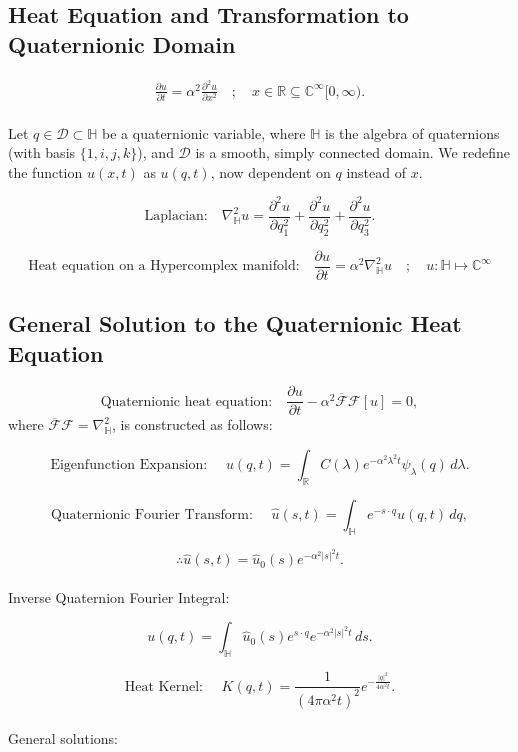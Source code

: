 \documentclass{article}
\begin{document}
\subsection{Heat Equation and Transformation to Quaternionic Domain}

\begin{align}
\frac{\partial u}{\partial t} = \alpha^{2} \frac{\partial^{2} u}{\partial x^{2}}\quad ; \quad x\in \mathbb{R} \subseteq \mathbb{C}^{\infty} [0,\infty). 
\end{align} \\
Let \( q \in \mathcal{D} \subset \mathbb{H} \) be a quaternionic variable, where \( \mathbb{H} \) is the algebra of quaternions (with basis \( \{1, i, j, k\} \)), and \( \mathcal{D} \) is a smooth, simply connected domain. We redefine the function \( u(x,t) \) as \( u(q,t) \), now dependent on \( q \) instead of \( x \).

\[
\text{Laplacian:} \quad \nabla_{\mathbb{H}}^2 u = \frac{\partial^2 u}{\partial q_1^2} + \frac{\partial^2 u}{\partial q_2^2} + \frac{\partial^2 u}{\partial q_3^2}.
\]

\[
\text{Heat equation on a Hypercomplex manifold:} \quad \frac{\partial u}{\partial t} = \alpha^2 \nabla_{\mathbb{H}}^2 u \quad ; \quad u : \mathbb{H} \mapsto \mathbb{C}^{\infty}
\]

\subsection{General Solution to the Quaternionic Heat Equation}

\[
\text{Quaternionic heat equation:} \quad \frac{\partial u}{\partial t} - \alpha^2 \overline{\mathcal{F}} \mathcal{F} [u] = 0,
\]
where \(\overline{\mathcal{F}} \mathcal{F} = \nabla_{\mathbb{H}}^2\), is constructed as follows:

\[
\text{Eigenfunction Expansion: }\quad  u(q,t) = \int_{\mathbb{R}} C(\lambda) e^{-\alpha^2 \lambda^2 t} \psi_\lambda(q) \, d\lambda.
\]

\[
\text{Quaternionic Fourier Transform: } \quad \hat{u}(s,t) = \int_{\mathbb{H}} e^{-s \cdot q} u(q,t) \, dq,
\]

\[
\therefore \hat{u}(s,t) = \hat{u}_0(s) e^{-\alpha^2 |s|^2 t}.
\] \\ 
Inverse Quaternion Fourier Integral:

\[
u(q,t) = \int_{\mathbb{H}} \hat{u}_0(s) e^{s \cdot q} e^{-\alpha^2 |s|^2 t} \, ds.
\]

\[
\text{Heat Kernel: } \quad K(q,t) = \frac{1}{(4\pi \alpha^2 t)^2} e^{-\frac{|q|^2}{4\alpha^2 t}}.
\] \\ 
General solutions: 
\end{document}
